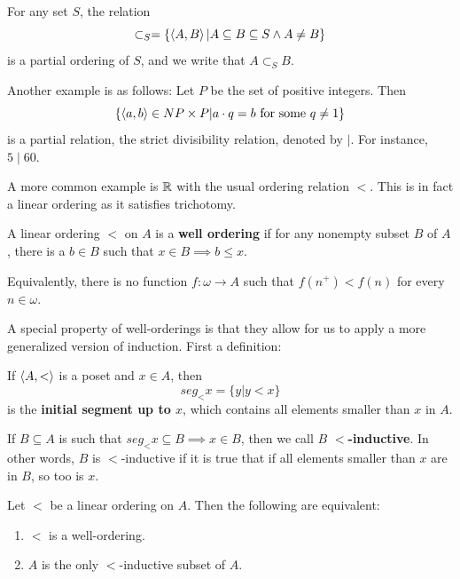 \begin{example}
    For any set $S$, the relation 
    \[\subset_S = \{\left\langle A,B \right\rangle| A \subseteq B \subseteq S \wedge A \neq B\}\]
    is a partial ordering of $S$, and we write that $A \subset_S B$. 

    Another example is as follows: Let $P$ be the set of positive integers. Then 
    \[\{\left\langle a,b \right\rangle \in NP \times P | a \cdot q = b \text{ for some $q \neq 1$}\}\]
    is a partial relation, the strict divisibility relation, denoted by $\mid$. For instance, $5 \mid 60$. 

    A more common example is $\mathbb{R}$ with the usual ordering relation $<$. This is in fact a linear ordering as it satisfies trichotomy. 
\end{example}

\begin{definition}
    A linear ordering $<$ on $A$ is a \textbf{well ordering} if for any nonempty subset $B$ of $A$, there is a $b \in B$ such that $x \in B \implies b \leq x$. 

    Equivalently, there is no function $f: \omega \to A$ such that $f(n^+) < f(n)$ for every $n \in \omega$. 
\end{definition}

A special property of well-orderings is that they allow for us to apply a more generalized version of induction. First a definition:

\begin{definition}
    If $\left\langle A,< \right\rangle$ is a poset and $x \in A$, then 
    \[seg_<x = \{y | y < x\}\]
    is the \textbf{initial segment up to $x$}, which contains all elements smaller than $x$ in $A$. 
    
    If $B \subseteq A$ is such that $seg_<x \subseteq B \implies x \in B$, then we call $B$ \textbf{$<$-inductive}. In other words, $B$ is $<$-inductive if it is true that if all elements smaller than $x$ are in $B$, so too is $x$.  
\end{definition}

\begin{theorem}
    Let $<$ be a linear ordering on $A$. Then the following are equivalent: 

    \begin{enumerate}[label=(\roman*)]
        \item $<$ is a well-ordering.
        \item $A$ is the only $<$-inductive subset of $A$. 
    \end{enumerate}
\end{theorem}

